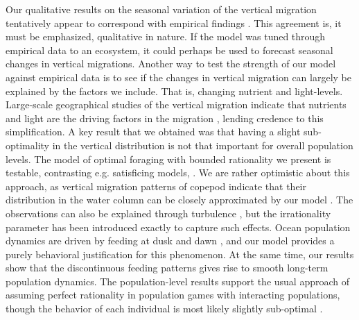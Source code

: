 


Our qualitative results on the seasonal variation of the vertical migration tentatively appear to correspond with empirical findings \citep{wang2014seasonal, beaugrand2001geographical, colebrook1979continuous}. This agreement is, it must be emphasized, qualitative in nature. If the model was tuned through empirical data to an ecosystem, it could perhaps be used to forecast seasonal changes in vertical migrations. Another way to test the strength of our model against empirical data is to see if the changes in vertical migration can largely be explained by the factors we include. That is, changing nutrient and light-levels. Large-scale geographical studies of the vertical migration indicate that nutrients and light are the driving factors in the migration \citep{klevjer2016large}, lending credence to this simplification. A key result that we obtained was that having a slight sub-optimality in the vertical distribution is not that important for overall population levels. The model of optimal foraging with bounded rationality we present is testable, contrasting e.g. satisficing models, \citep{nonacs1993satisficing}. We are rather optimistic about this approach, as vertical migration patterns of copepod indicate that their distribution in the water column can be closely approximated by our model \citep{hay1991zooplankton, visser2001observations}. The observations can also be explained through turbulence \citep{visser2001observations}, but the irrationality parameter has been introduced exactly to capture such effects. Ocean population dynamics are driven by feeding at dusk and dawn \citep{benoit2014critical}, and our model provides a purely behavioral justification for this phenomenon. At the same time, our results show that the discontinuous feeding patterns gives rise to smooth long-term population dynamics. The population-level results support the usual approach of assuming perfect rationality in population games with interacting populations, though the behavior of each individual is most likely slightly sub-optimal \citep{hurly1999context}.

